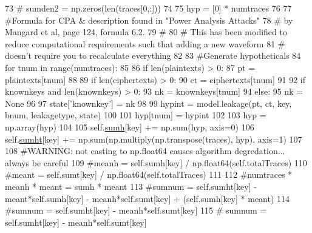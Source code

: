 \begin{DoxyCode}
{73             \textcolor{comment}{# sumden2 = np.zeros(len(traces[0,:]))}
74 
75             hyp = [0] * numtraces
76 
77             \textcolor{comment}{#Formula for CPA & description found in "Power Analysis Attacks"}
78             \textcolor{comment}{# by Mangard et al, page 124, formula 6.2.}
79             \textcolor{comment}{#}
80             \textcolor{comment}{# This has been modified to reduce computational requirements such that adding a new waveform}
81             \textcolor{comment}{# doesn't require you to recalculate everything}
82 
83             \textcolor{comment}{#Generate hypotheticals}
84             \textcolor{keywordflow}{for} tnum \textcolor{keywordflow}{in} range(numtraces):
85 
86                 \textcolor{keywordflow}{if} len(plaintexts) > 0:
87                     pt = plaintexts[tnum]
88 
89                 \textcolor{keywordflow}{if} len(ciphertexts) > 0:
90                     ct = ciphertexts[tnum]
91 
92                 \textcolor{keywordflow}{if} knownkeys \textcolor{keywordflow}{and} len(knownkeys) > 0:
93                     nk = knownkeys[tnum]
94                 \textcolor{keywordflow}{else}:
95                     nk = \textcolor{keywordtype}{None}
96 
97                 state[\textcolor{stringliteral}{'knownkey'}] = nk
98 
99                 hypint = model.leakage(pt, ct, key, bnum, leakagetype, state)
100 
101                 hyp[tnum] = hypint
102 
103             hyp = np.array(hyp)
104 
105             self.\hyperlink{classsoftware_1_1chipwhisperer_1_1analyzer_1_1attacks_1_1cpa__algorithms_1_1progressive_1_1CPAProgressiveOneSubkey_aaf99598968c1ab0c7836bf3fdee9c309}{sumh}[key] += np.sum(hyp, axis=0)
106             self.\hyperlink{classsoftware_1_1chipwhisperer_1_1analyzer_1_1attacks_1_1cpa__algorithms_1_1progressive_1_1CPAProgressiveOneSubkey_abd38d5556813178f7c8b0b4f45bed94c}{sumht}[key] += np.sum(np.multiply(np.transpose(traces), hyp), axis=1)
107 
108             \textcolor{comment}{#WARNING: not casting to np.float64 causes algorithm degredation... always be careful}
109             \textcolor{comment}{#meanh = self.sumh[key] / np.float64(self.totalTraces)}
110             \textcolor{comment}{#meant = self.sumt[key] / np.float64(self.totalTraces)}
111 
112             \textcolor{comment}{#numtraces * meanh * meant = sumh * meant}
113             \textcolor{comment}{#sumnum =  self.sumht[key] - meant*self.sumh[key] - meanh*self.sumt[key] + (self.sumh[key] *
       meant)}
114             \textcolor{comment}{#sumnum =  self.sumht[key] - meanh*self.sumt[key]}
115 \textcolor{comment}{#            sumnum =  self.sumht[key] - meanh*self.sumt[key]}
}
\end{DoxyCode}
